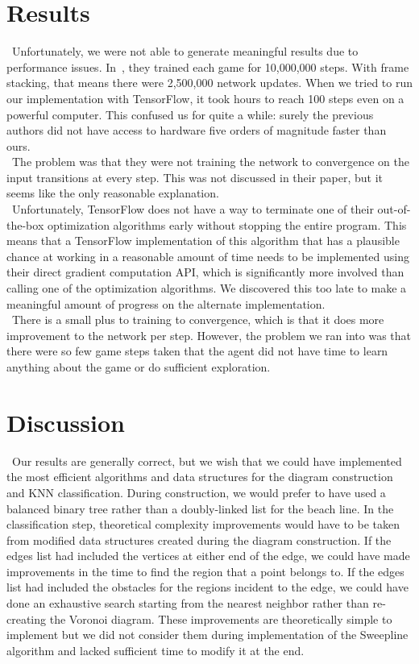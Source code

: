 \documentclass[conference]{IEEEtran}
\begin{document}
\section{Results}
\noindent\ Unfortunately, we were not able to generate meaningful results due
to performance issues. In~\cite{mnih2013playing}, they trained each game for
10,000,000 steps. With frame stacking, that means there were 2,500,000 network
updates.  When we tried to run our implementation with TensorFlow, it took
hours to reach 100 steps even on a powerful computer. This confused us for
quite a while: surely the previous authors did not have access to hardware five
orders of magnitude faster than ours.\\
\indent\ The problem was that they were not training the network to convergence
on the input transitions at every step. This was not discussed in their paper,
but it seems like the only reasonable explanation.\\
\indent\ Unfortunately, TensorFlow does not have a way to terminate one of
their out-of-the-box optimization algorithms early without stopping the entire
program. This means that a TensorFlow implementation of this algorithm that has
a plausible chance at working in a reasonable amount of time needs to be
implemented using their direct gradient computation API, which is significantly
more involved than calling one of the optimization algorithms. We discovered
this too late to make a meaningful amount of progress on the alternate
implementation.\\
\indent\ There is a small plus to training to convergence, which is that it
does more improvement to the network per step. However, the problem we ran into
was that there were so few game steps taken that the agent did not have time to
learn anything about the game or do sufficient exploration.

\section{Discussion}
\noindent\ Our results are generally correct, but we wish that we could have
implemented the most efficient algorithms and data structures for the diagram
construction and KNN classification. During construction, we would prefer to
have used a balanced binary tree rather than a doubly-linked list for the beach
line. In the classification step, theoretical complexity improvements would have
to be taken from modified data structures created during the diagram construction.
If the edges list had included the vertices at either end of the edge, we could
have made improvements in the time to find the region that a point belongs to.
If the edges list had included the obstacles for the regions incident to the
edge, we could have done an exhaustive search starting from the nearest neighbor
rather than re-creating the Voronoi diagram. These improvements are theoretically
simple to implement but we did not consider them during implementation of the
Sweepline algorithm and lacked sufficient time to modify it at the end.
\end{document}
